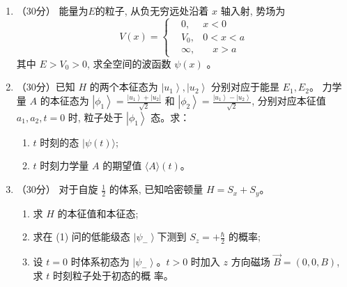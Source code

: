 

\begin{enumerate}
	\item
	（30分） 能量为$  E $的粒子, 从负无穷远处沿着 $x$ 轴入射, 势场为
	\[ 
	V(x)=\left\{\begin{aligned}&0, &  x<0 \\ &V_{0}, & 0<x<a \\ &\infty, &  \quad x>a\end{aligned}\right.
	 \]
	其中 $E>V_{0}>0$, 求全空间的波函数 $\psi(x)$ 。


\banswer{
	
}

	
\item 
（30分）已知 $H$ 的两个本征态为 $\left|u_{1}\right\rangle,\left|u_{2}\right\rangle$ 分别对应于能昰 $E_{1}, E_{2}$。 力学量 $A$ 的本征态为	
$\left|\phi_{1}\right\rangle=\frac{\left|u_{1}\right\rangle+\left|u_{2}\right|}{\sqrt{2}}$ 和 $\left|\phi_{2}\right\rangle=\frac{\left|u_{1}\right\rangle-\left|u_{2}\right\rangle}{\sqrt{2}}$, 分别对应本征值 $a_{1}, a_{2}, t=0$ 时, 粒子处于 $\left|\phi_{1}\right\rangle$ 态。求：
\begin{enumerate}
	\item
	$t$ 时刻的态 $|\psi(t)\rangle$;
	\item
	 $t$ 时刻力学量 $A$ 的期望值 $\langle A\rangle(t)$。
	
	
	
\end{enumerate}

\banswer{
	
}

\item 
（30分）
对于自旋 $\frac{1}{2}$ 的体系, 已知哈密顿量 $H=S_{x}+S_{y}$。
\begin{enumerate}
	\item
	求 $H$ 的本征值和本征态;
	\item
	求在 (1) 问的低能级态 $\left|\psi_{-}\right\rangle$下测到 $S_{z}=+\frac{\hbar}{2}$ 的概率;
	\item 
	设 $t=0$ 时体系初态为 $\left|\psi_{-}\right\rangle $。$ t>0$ 时加入 $z$ 方向磁场 $\vec{B}=(0,0, B)$, 求 $t$ 时刻粒子处于初态的概 率。
	

\end{enumerate}
\end{enumerate}
